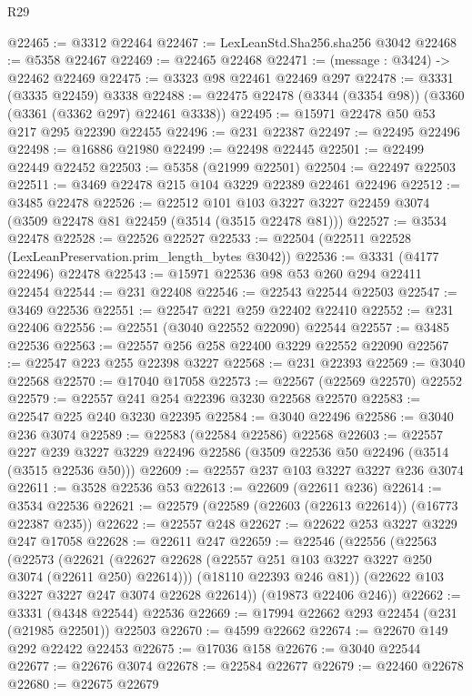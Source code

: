 \begin{lexlean}{R29}
\begin{coremodule}
@22465 := @3312 @22464
@22467 := LexLeanStd.Sha256.sha256 @3042
@22468 := @5358 @22467
@22469 := @22465 @22468
@22471 := (message : @3424) -> @22462 @22469
@22475 := @3323 @98 @22461 @22469 @297
@22478 := @3331 (@3335 @22459) @3338
@22488 := @22475 @22478 (@3344 (@3354 @98)) (@3360 (@3361 (@3362 @297) @22461 @3338))
@22495 := @15971 @22478 @50 @53 @217 @295 @22390 @22455
@22496 := @231 @22387
@22497 := @22495 @22496
@22498 := @16886 @21980
@22499 := @22498 @22445
@22501 := @22499 @22449 @22452
@22503 := @5358 (@21999 @22501)
@22504 := @22497 @22503
@22511 := @3469 @22478 @215 @104 @3229 @22389 @22461 @22496
@22512 := @3485 @22478
@22526 := @22512
    @101
    @103
    @3227
    @3227
    @22459
    @3074
    (@3509 @22478 @81 @22459 (@3514 (@3515 @22478 @81)))
@22527 := @3534 @22478
@22528 := @22526 @22527
@22533 := @22504 (@22511 @22528 (LexLeanPreservation.prim_length_bytes @3042))
@22536 := @3331 (@4177 @22496) @22478
@22543 := @15971 @22536 @98 @53 @260 @294 @22411 @22454
@22544 := @231 @22408
@22546 := @22543 @22544 @22503
@22547 := @3469 @22536
@22551 := @22547 @221 @259 @22402 @22410
@22552 := @231 @22406
@22556 := @22551 (@3040 @22552 @22090) @22544
@22557 := @3485 @22536
@22563 := @22557 @256 @258 @22400 @3229 @22552 @22090
@22567 := @22547 @223 @255 @22398 @3227
@22568 := @231 @22393
@22569 := @3040 @22568
@22570 := @17040 @17058
@22573 := @22567 (@22569 @22570) @22552
@22579 := @22557 @241 @254 @22396 @3230 @22568 @22570
@22583 := @22547 @225 @240 @3230 @22395
@22584 := @3040 @22496
@22586 := @3040 @236 @3074
@22589 := @22583 (@22584 @22586) @22568
@22603 := @22557
    @227
    @239
    @3227
    @3229
    @22496
    @22586
    (@3509 @22536 @50 @22496 (@3514 (@3515 @22536 @50)))
@22609 := @22557 @237 @103 @3227 @3227 @236 @3074
@22611 := @3528 @22536 @53
@22613 := @22609 (@22611 @236)
@22614 := @3534 @22536
@22621 := @22579 (@22589 (@22603 (@22613 @22614)) (@16773 @22387 @235))
@22622 := @22557 @248
@22627 := @22622 @253 @3227 @3229 @247 @17058
@22628 := @22611 @247
@22659 := @22546
    (@22556
      (@22563
        (@22573
          (@22621 (@22627 @22628 (@22557 @251 @103 @3227 @3227 @250 @3074 (@22611 @250) @22614)))
          (@18110 @22393 @246 @81))
        (@22622 @103 @3227 @3227 @247 @3074 @22628 @22614))
      (@19873 @22406 @246))
@22662 := @3331 (@4348 @22544) @22536
@22669 := @17994 @22662 @293 @22454 (@231 (@21985 @22501)) @22503
@22670 := @4599 @22662
@22674 := @22670 @149 @292 @22422 @22453
@22675 := @17036 @158
@22676 := @3040 @22544
@22677 := @22676 @3074
@22678 := @22584 @22677
@22679 := @22460 @22678
@22680 := @22675 @22679

\end{coremodule}
\end{lexlean}
